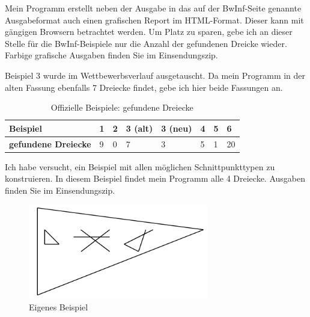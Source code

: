Mein Programm erstellt neben der Ausgabe in das auf der BwInf-Seite genannte
Ausgabeformat auch einen grafischen Report im HTML-Format.
Dieser kann mit gängigen Browsern betrachtet werden.
Um Platz zu sparen, gebe ich an dieser Stelle für die BwInf-Beispiele nur die Anzahl
der gefundenen Dreicke wieder. Farbige grafische Ausgaben finden Sie im Einsendungszip.

Beispiel 3 wurde im Wettbewerbsverlauf ausgetauscht. Da mein Programm in der alten
Fassung ebenfalls 7 Dreiecke findet, gebe ich hier beide Fassungen an.

\begin{table}[h]
    \centering
    \begin{tabular}{l|lllllll}
        \textbf{Beispiel}           & 1 & 2 & 3 (alt) & 3 (neu) & 4 & 5 & 6 \\ \hline
        \textbf{gefundene Dreiecke} & 9 & 0 & 7       & 3 & 5 & 1 & 20
    \end{tabular}
    \caption{Offizielle Beispiele: gefundene Dreiecke}
    \label{tab:bwinfbeispiele}
\end{table}

Ich habe versucht, ein Beispiel mit allen möglichen Schnittpunkttypen zu konstruieren.
In diesem Beispiel findet mein Programm alle 4 Dreiecke.
Ausgaben finden Sie im Einsendungszip.

\begin{figure}[h]
\centering
\includegraphics[width=0.7\textwidth]{eigbeispiel}
\caption{Eigenes Beispiel}
\end{figure}
